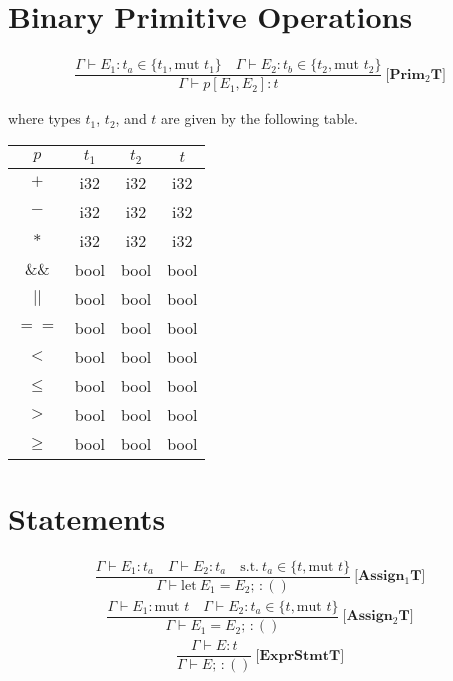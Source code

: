 \documentclass[11pt]{article}
\begin{document}
    \section*{Binary Primitive Operations}
    \begin{align*}
        \dfrac{\Gamma \vdash E_1 : t_a \in \{t_1, \text{mut }t_1\} \quad \Gamma \vdash E_2 : t_b \in \{t_2, \text{mut }t_2\}}{\Gamma \vdash p[E_1,E_2] : t} \ \textbf{[Prim$_2$T]}
    \end{align*}

    \begin{flushleft}
        where types $t_1$, $t_2$, and $t$ are given by the following table. \newline

        \begin{tabular}{|c|c|c|c|}
            \hline
            $p$ & $t_1$ & $t_2$ & $t$ \\ \hline
            $+$ & i32 & i32 & i32 \\ \hline
            $-$ & i32 & i32 & i32 \\ \hline
            $*$ & i32 & i32 & i32 \\ \hline
            $\&\&$ & bool & bool & bool \\ \hline
            $||$ & bool & bool & bool \\ \hline
            $==$ & bool & bool & bool \\ \hline
            $<$ & bool & bool & bool \\ \hline
            $\leq$ & bool & bool & bool \\ \hline
            $>$ & bool & bool & bool \\ \hline
            $\geq$ & bool & bool & bool \\ \hline
        \end{tabular}
    \end{flushleft}

    \section*{Statements}
    \begin{align*}
        \dfrac{\Gamma \vdash E_1: t_a \quad \Gamma \vdash E_2 : t_a \quad \text{s.t.} \ t_a \in \{t, \text{mut }t\}}
        {\Gamma \vdash \text{let} \ E_1 = E_2; \, : ()} \ \textbf{[Assign$_1$T]}
    \end{align*}
    \begin{align*}
        \dfrac{\Gamma \vdash E_1: \text{mut } t \quad \Gamma \vdash E_2 : t_a \in \{t, \text{mut }t\}}
        {\Gamma \vdash E_1 = E_2; \, : ()} \ \textbf{[Assign$_2$T]}
    \end{align*}
    \begin{align*}
        \dfrac{\Gamma \vdash E: t}{\Gamma \vdash E; \, : ()} \ \textbf{[ExprStmtT]}
    \end{align*}
\end{document}
